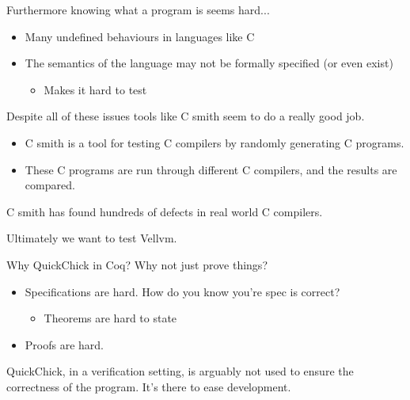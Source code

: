 \documentclass{beamer}
\begin{document}
\begin{frame}
  Furthermore knowing what a program is seems hard...

  \begin{itemize}
  \item Many undefined behaviours in languages like C
  \item The semantics of the language may not be formally specified
    (or even exist)
    \begin{itemize}
    \item Makes it hard to test
    \end{itemize}
  \end{itemize}
\end{frame}

\begin{frame}

  Despite all of these issues tools like C smith seem to do a really
  good job.

  \begin{itemize}
  \item C smith is a tool for testing C compilers by randomly
    generating C programs.
  \item These C programs are run through different C compilers, and
    the results are compared.
  \end{itemize}

  C smith has found hundreds of defects in real world C compilers.
\end{frame}

\begin{frame}
  Ultimately we want to test Vellvm.
\end{frame}

\begin{frame}
  Why QuickChick in Coq? Why not just prove things?

  \begin{itemize}
  \item Specifications are hard. How do you know you're spec is
    correct?
    \begin{itemize}
    \item Theorems are hard to state
    \end{itemize}
  \item Proofs are hard.
  \end{itemize}

  QuickChick, in a verification setting, is arguably not used to
  ensure the correctness of the program. It's there to ease
  development.
\end{frame}
\end{document}
